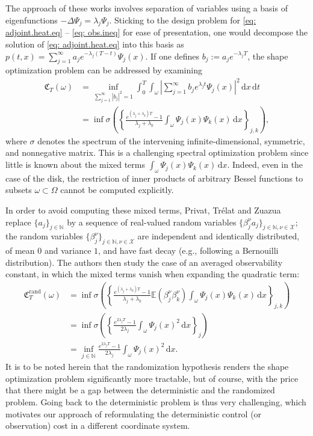 \documentclass[11pt, a4paper, reqno]{amsart}
\newcommand{\diff}{\, \mathrm{d}}
\newcommand{\N}{\mathbb{N}}
\theoremstyle{plain}
\numberwithin{equation}{section}
\begin{document}
	The approach of these works involves separation of variables using a basis of eigenfunctions $-\Delta \Psi_j = \lambda_j \Psi_j$. Sticking to the design problem for \eqref{eq: adjoint.heat.eq} -- \eqref{eq: obs.ineq} for ease of presentation, one would decompose the solution of \eqref{eq: adjoint.heat.eq} into this basis as $p(t,x) = \sum_{j=1}^\infty a_j e^{-\lambda_j(T-t)}\Psi_j(x)$. If one defines $b_j := a_je^{-\lambda_j T}$, the shape optimization problem can be addressed by examining
	\begin{align*}
	\mathfrak{C}_T(\omega) &= \inf_{\sum_{j=1}^\infty|b_j|^2=1} \int_0^T \int_\omega \left|\sum_{j=1}^\infty b_j e^{\lambda_j t} \Psi_j(x)\right|^2 \diff x \diff t \\
	&= \inf \sigma\left(\left\{\frac{e^{(\lambda_j+\lambda_k)T}-1}{\lambda_j+\lambda_k}\int_\omega\Psi_j(x)\Psi_k(x)\diff x\right\}_{j,k}\right),
	\end{align*}
	where $\sigma$ denotes the spectrum of the intervening infinite-dimensional, symmetric, and nonnegative matrix. This is a challenging spectral optimization problem since little is known about the mixed terms $\int_\omega \Psi_j(x)\Psi_k(x)\diff x$. 
	Indeed, even in the case of the disk, the restriction of inner products of arbitrary Bessel functions to subsets $\omega\subset\Omega$ cannot be computed explicitly. 
	
	In order to avoid computing these mixed terms, Privat, Trélat and Zuazua replace $\{a_j\}_{j\in\N}$ by a sequence of real-valued random variables $\{\beta_j^\nu a_j\}_{j\in\N, \nu \in \mathcal{X}}$; the random variables $\{\beta_j^\nu\}_{j\in\N, \nu\in\mathcal{X}}$ are independent and identically distributed, of mean $0$ and variance $1$, and have fast decay (e.g., following a Bernouilli distribution). The authors then study the case of an averaged observability constant, in which the mixed terms vanish when expanding the quadratic term: 
	\begin{align*}
	\mathfrak{C}_T^{\mathrm{rand}}(\omega) &= \inf \sigma\left(\left\{\frac{e^{(\lambda_j+\lambda_k)T}-1}{\lambda_j + \lambda_k} \mathbb{E}(\beta_j^\nu \beta_k^\nu) \int_\omega \Psi_j(x)\Psi_k(x)\diff x\right\}_{j,k}\right)\\
	&= \inf\sigma\left(\left\{\frac{e^{2\lambda_jT}-1}{2\lambda_j} \int_\omega \Psi_j(x)^2\diff x\right\}_j\right)\\
	&= \inf_{j\in\N} \frac{e^{2\lambda_jT}-1}{2\lambda_j} \int_\omega \Psi_j(x)^2\diff x.
	\end{align*}
	It is to be noted herein that the randomization hypothesis renders the shape optimization problem significantly more tractable, but of course, with the price that there might be a gap between the deterministic and the randomized problem. 
	Going back to the deterministic problem is thus very challenging, which motivates our approach of reformulating the deterministic control (or observation) cost in a different coordinate system. 
	
\end{document}
